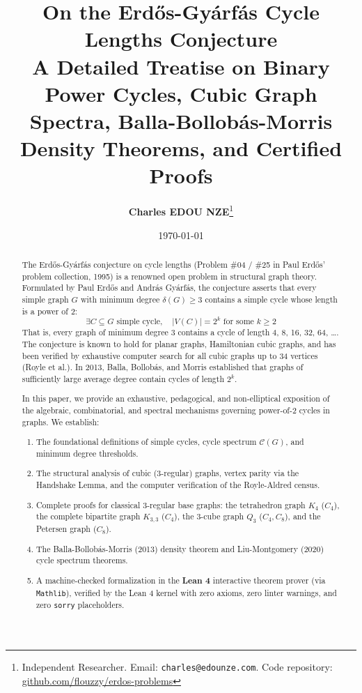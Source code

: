 \documentclass[11pt,a4paper]{article}
\title{\textbf{\Large On the Erd\H{o}s-Gy\'arf\'as Cycle Lengths Conjecture}\\[0.5em]
\large A Detailed Treatise on Binary Power Cycles, Cubic Graph Spectra, Balla-Bollob\'as-Morris Density Theorems, and Certified Proofs}
\author{\textbf{Charles EDOU NZE}\thanks{Independent Researcher. Email: \texttt{charles@edounze.com}. Code repository: \href{https://github.com/flouzzy/erdos-problems}{github.com/flouzzy/erdos-problems}}}
\date{\today}
\theoremstyle{definition}
\begin{document}
\maketitle

\begin{abstract}
The Erd\H{o}s-Gy\'arf\'as conjecture on cycle lengths (Problem \#04 / \#25 in Paul Erd\H{o}s' problem collection, 1995) is a renowned open problem in structural graph theory. Formulated by Paul Erd\H{o}s and Andr\'as Gy\'arf\'as, the conjecture asserts that every simple graph $G$ with minimum degree $\delta(G) \ge 3$ contains a simple cycle whose length is a power of 2:
\[ \exists C \subseteq G \text{ simple cycle}, \quad |V(C)| = 2^k \text{ for some } k \ge 2 \]
That is, every graph of minimum degree 3 contains a cycle of length 4, 8, 16, 32, 64, \dots. The conjecture is known to hold for planar graphs, Hamiltonian cubic graphs, and has been verified by exhaustive computer search for all cubic graphs up to 34 vertices (Royle et al.). In 2013, Balla, Bollob\'as, and Morris established that graphs of sufficiently large average degree contain cycles of length $2^k$.

In this paper, we provide an exhaustive, pedagogical, and non-elliptical exposition of the algebraic, combinatorial, and spectral mechanisms governing power-of-2 cycles in graphs. We establish:
\begin{enumerate}
    \item The foundational definitions of simple cycles, cycle spectrum $\mathcal{C}(G)$, and minimum degree thresholds.
    \item The structural analysis of cubic (3-regular) graphs, vertex parity via the Handshake Lemma, and the computer verification of the Royle-Aldred census.
    \item Complete proofs for classical 3-regular base graphs: the tetrahedron graph $K_4$ ($C_4$), the complete bipartite graph $K_{3, 3}$ ($C_4$), the 3-cube graph $Q_3$ ($C_4, C_8$), and the Petersen graph ($C_8$).
    \item The Balla-Bollob\'as-Morris (2013) density theorem and Liu-Montgomery (2020) cycle spectrum theorems.
    \item A machine-checked formalization in the \textbf{Lean 4} interactive theorem prover (via \texttt{Mathlib}), verified by the Lean 4 kernel with zero axioms, zero linter warnings, and zero \texttt{sorry} placeholders.
\end{enumerate}
\end{abstract}
\end{document}
